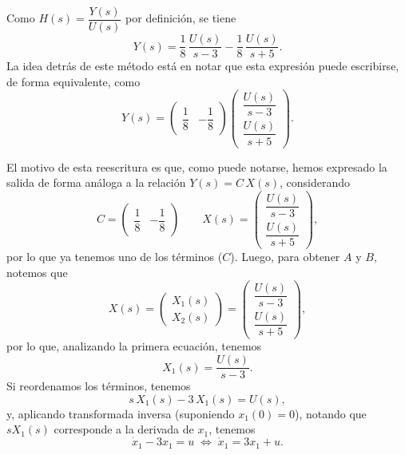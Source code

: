 \documentclass[
  11pt,
  letterpaper,
   addpoints,
   answers
  ]{exam}
\begin{document}
\begin{questions}
\begin{solution}
Como $H(s) = \dfrac{Y(s)}{U(s)}$ por definición, se tiene
\begin{equation}
Y(s) = \frac{1}{8}\,\frac{U(s)}{s-3} - \frac{1}{8}\,\frac{U(s)}{s+5}.
\end{equation}
La idea detrás de este método está en notar que esta expresión puede escribirse, de forma equivalente, como
\begin{equation}
Y(s) = \begin{pmatrix} \dfrac{1}{8} & -\dfrac{1}{8} \end{pmatrix}
\begin{pmatrix}
\dfrac{U(s)}{s-3} \\[8pt]
\dfrac{U(s)}{s+5}
\end{pmatrix}.
\end{equation}

El motivo de esta reescritura es que, como puede notarse, hemos expresado la salida de forma análoga a la relación $Y(s)=C\,X(s)$, considerando
\begin{equation}
C = \begin{pmatrix} \dfrac{1}{8} & -\dfrac{1}{8} \end{pmatrix}
\qquad
X(s) =
\begin{pmatrix}
\dfrac{U(s)}{s-3} \\[8pt]
\dfrac{U(s)}{s+5}
\end{pmatrix},
\end{equation}
por lo que ya tenemos uno de los términos ($C$). Luego, para obtener $A$ y $B$, notemos que
\begin{equation}
X(s) =
\begin{pmatrix}
X_1(s) \\ X_2(s)
\end{pmatrix}
=
\begin{pmatrix}
\dfrac{U(s)}{s-3} \\[8pt]
\dfrac{U(s)}{s+5}
\end{pmatrix},
\end{equation}
por lo que, analizando la primera ecuación, tenemos
\begin{equation}
X_1(s) = \frac{U(s)}{s-3}.
\end{equation}
Si reordenamos los términos, tenemos
\begin{equation}
s\,X_1(s) - 3\,X_1(s) = U(s),
\end{equation}
y, aplicando transformada inversa (suponiendo $x_1(0)=0$), notando que $sX_1(s)$ corresponde a la derivada de $x_1$, tenemos
\begin{equation}
\dot{x}_1 - 3x_1 = u \;\Leftrightarrow\; \dot{x}_1 = 3x_1 + u.

\end{equation}
\end{solution}
\end{questions}
\end{document}

